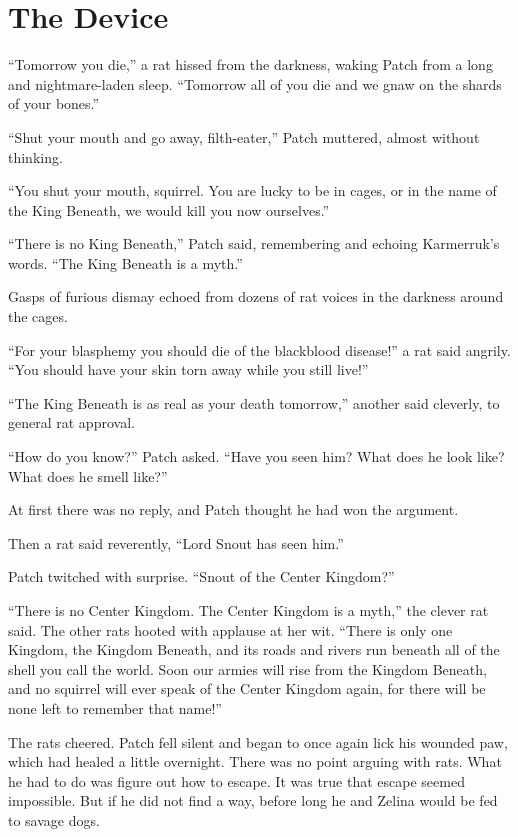 \documentclass[ebook,oneside,openany,12pt]{memoir}
\begin{document}

\section{The Device}

“Tomorrow you die,” a rat hissed from the darkness, waking Patch from
a long and nightmare-laden sleep. “Tomorrow all of you die and we gnaw
on the shards of your bones.”

“Shut your mouth and go away, filth-eater,” Patch muttered, almost
without thinking.

“You shut your mouth, squirrel. You are lucky to be in cages, or in
the name of the King Beneath, we would kill you now ourselves.”

“There is no King Beneath,” Patch said, remembering and echoing
Karmerruk’s words. “The King Beneath is a myth.”

Gasps of furious dismay echoed from dozens of rat voices in the
darkness around the cages.

“For your blasphemy you should die of the blackblood disease!” a rat
said angrily. “You should have your skin torn away while you still
live!”

“The King Beneath is as real as your death tomorrow,” another said
cleverly, to general rat approval.

“How do you know?” Patch asked. “Have you seen him? What does he look
like? What does he smell like?”

At first there was no reply, and Patch thought he had won the
argument.

Then a rat said reverently, “Lord Snout has seen him.”

Patch twitched with surprise. “Snout of the Center Kingdom?”

“There is no Center Kingdom. The Center Kingdom is a myth,” the clever
rat said. The other rats hooted with applause at her wit. “There is
only one Kingdom, the Kingdom Beneath, and its roads and rivers run
beneath all of the shell you call the world. Soon our armies will rise
from the Kingdom Beneath, and no squirrel will ever speak of the
Center Kingdom again, for there will be none left to remember that
name!”

The rats cheered. Patch fell silent and began to once again lick his
wounded paw, which had healed a little overnight. There was no point
arguing with rats. What he had to do was figure out how to escape. It
was true that escape seemed impossible. But if he did not find a way,
before long he and Zelina would be fed to savage dogs.
\end{document}
